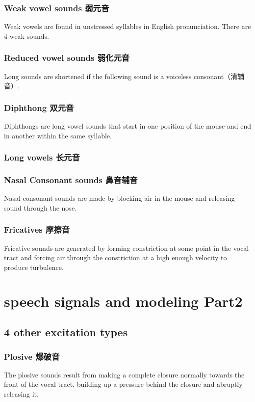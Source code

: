 \documentclass[UTF8]{ctexart}
\begin{document}
\subsubsection{Weak vowel sounds 弱元音}
Weak vowels are found in unstressed syllables in English pronunciation. There are 4 weak sounds.

\subsubsection{Reduced vowel sounds 弱化元音}
Long sounds are shortened if the following sound is a voiceless consonant（清辅音）.

\subsubsection{Diphthong 双元音}
Diphthongs are long vowel sounds that start in one position of the mouse and end in another within the same syllable.

\subsubsection{Long vowels 长元音}

\subsubsection{Nasal Consonant sounds 鼻音辅音}
Nasal consonant sounds are made by blocking air in the mouse and releasing sound through the nose.

\subsubsection{Fricatives 摩擦音}
Fricative sounds are generated by forming constriction at some point in the vocal tract and forcing air through the constriction at a high enough velocity to produce turbulence.


\section{speech signals and modeling Part2}

\subsection{4 other excitation types}
\subsubsection{Plosive 爆破音}
The plosive sounds result from making a complete closure normally towards the front of the vocal tract, building up a pressure behind the closure and abruptly releasing it.
\end{document}
